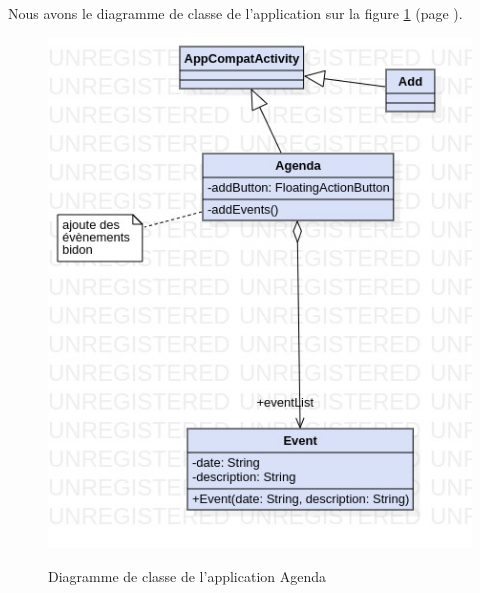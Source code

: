 \documentclass[a4paper]{article}
\begin{document}
\begin{multicols}{2}
      \paragraph{}
      Nous avons le diagramme de classe de l'application sur la figure \ref{fig:agendaClass} (page \pageref{fig:agendaClass}).
    \begin{figure}
      \centering
      \caption{Diagramme de classe de l'application Agenda}
      \includegraphics[height=\textwidth]{jpg/Model!Agenda_0}
      \label{fig:agendaClass}
    \end{figure}
  \end{multicols}
\end{document}
